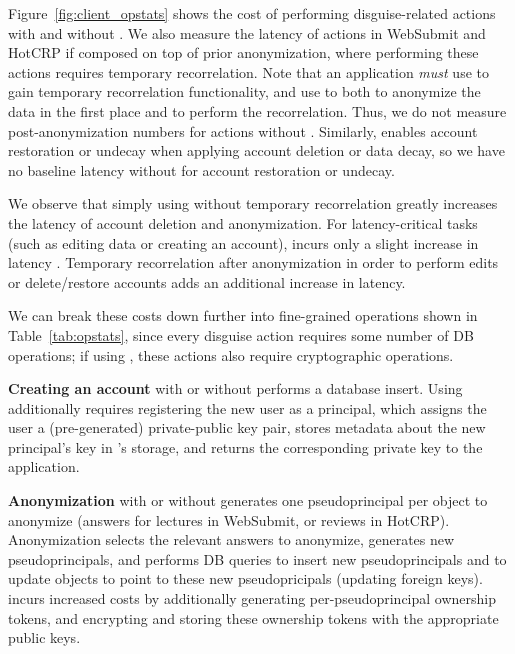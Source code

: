 %
%
Figure~\ref{fig:client_opstats} shows the cost of performing disguise-related actions with and
without \sys. We also measure the latency of actions in WebSubmit and HotCRP if composed on top of
prior anonymization, where performing these actions requires temporary recorrelation. Note that an
application \emph{must} use \sys to gain temporary recorrelation functionality, and use \sys to both
to anonymize the data in the first place and to perform the recorrelation. Thus, we do not measure
post-anonymization numbers for actions without \sys. Similarly, \sys enables account restoration or
undecay when applying account deletion or data decay, so we have no baseline latency without \sys
for account restoration or undecay.

We observe that simply using \sys without temporary recorrelation greatly increases the latency of
account deletion and anonymization.  For latency-critical tasks (such as editing data or creating an
account), \sys incurs only a slight increase in latency . Temporary recorrelation
after anonymization in order to perform edits or delete/restore accounts adds an additional
 increase in latency.

We can break these costs down further into fine-grained operations shown in 
Table~\ref{tab:opstats}, since every disguise action requires some number of DB operations; if using
\sys, these actions also require cryptographic operations.

\textbf{Creating an account} with or without \sys performs a database insert. Using \sys additionally
requires registering the new user as a principal, which assigns the user a (pre-generated)
private-public key pair, stores metadata about the new principal's key in \sys's storage, and
returns the corresponding private key to the application.

\textbf{Anonymization} with or without \sys generates one pseudoprincipal per object to anonymize
(\eg answers for lectures in WebSubmit, or reviews in HotCRP). Anonymization selects the relevant answers
to anonymize, generates new pseudoprincipals, and performs DB queries to insert new pseudoprincipals
and to update objects to point to these new pseudopricipals (\eg updating foreign keys).
\sys incurs increased costs by additionally generating per-pseudoprincipal ownership tokens, and 
encrypting and storing these ownership tokens with the appropriate public keys.

